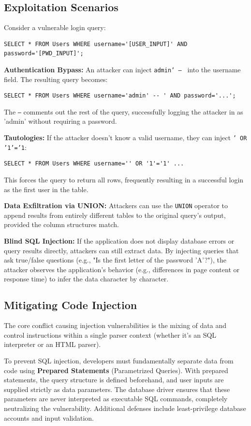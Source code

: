 \subsection{Exploitation Scenarios}
Consider a vulnerable login query:
\begin{verbatim}
SELECT * FROM Users WHERE username='[USER_INPUT]' AND password='[PWD_INPUT]';
\end{verbatim}

\textbf{Authentication Bypass:} An attacker can inject \texttt{admin' -- } into the username field. The resulting query becomes:
\begin{verbatim}
SELECT * FROM Users WHERE username='admin' -- ' AND password='...';
\end{verbatim}
The \texttt{--} comments out the rest of the query, successfully logging the attacker in as 'admin' without requiring a password.

\textbf{Tautologies:} If the attacker doesn't know a valid username, they can inject \texttt{' OR '1'='1}:
\begin{verbatim}
SELECT * FROM Users WHERE username='' OR '1'='1' ...
\end{verbatim}
This forces the query to return all rows, frequently resulting in a successful login as the first user in the table.

\textbf{Data Exfiltration via UNION:} Attackers can use the \texttt{UNION} operator to append results from entirely different tables to the original query's output, provided the column structures match.

\textbf{Blind SQL Injection:} If the application does not display database errors or query results directly, attackers can still extract data. By injecting queries that ask true/false questions (e.g., "Is the first letter of the password 'A'?"), the attacker observes the application's behavior (e.g., differences in page content or response time) to infer the data character by character.

\subsection{Mitigating Code Injection}
The core conflict causing injection vulnerabilities is the mixing of data and control instructions within a single parser context (whether it's an SQL interpreter or an HTML parser).

To prevent SQL injection, developers must fundamentally separate data from code using \textbf{Prepared Statements} (Parametrized Queries). With prepared statements, the query structure is defined beforehand, and user inputs are supplied strictly as data parameters. The database driver ensures that these parameters are never interpreted as executable SQL commands, completely neutralizing the vulnerability. Additional defenses include least-privilege database accounts and input validation.

